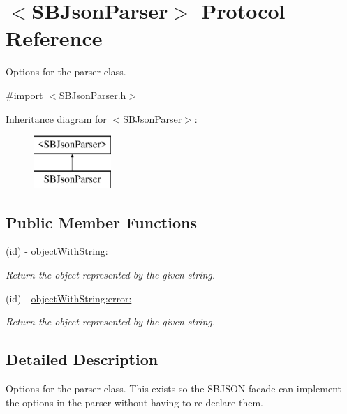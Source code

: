 \hypertarget{protocol_s_b_json_parser-p}{
\section{$<$SBJsonParser$>$ Protocol Reference}
\label{protocol_s_b_json_parser-p}
}


Options for the parser class.  




{\ttfamily \#import $<$SBJsonParser.h$>$}

Inheritance diagram for $<$SBJsonParser$>$:\begin{figure}[H]
\begin{center}
\leavevmode
\includegraphics[height=2.000000cm]{protocol_s_b_json_parser-p}
\end{center}
\end{figure}
\subsection*{Public Member Functions}
\begin{DoxyCompactItemize}
\item 
(id) -\/ \hyperlink{protocol_s_b_json_parser-p_a5183c152f4a9e5e79bb9534fcbdf7bf6}{objectWithString:}
\begin{DoxyCompactList}\small\item\em Return the object represented by the given string. \item\end{DoxyCompactList}\item 
(id) -\/ \hyperlink{protocol_s_b_json_parser-p_a7ffc84c6757a1b11247679a5e6a4a6e1}{objectWithString:error:}
\begin{DoxyCompactList}\small\item\em Return the object represented by the given string. \item\end{DoxyCompactList}\end{DoxyCompactItemize}


\subsection{Detailed Description}
Options for the parser class. This exists so the SBJSON facade can implement the options in the parser without having to re-\/declare them. 

